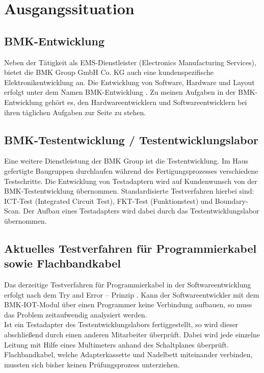 

\section{Ausgangssituation}


\subsection{BMK-Entwicklung}
Neben der Tätigkeit als EMS-Dienstleister (Electronics Manufacturing Services), bietet die \glqq BMK Group GmbH  Co. KG\grqq{} auch eine kundenspezifische Elektronikentwicklung an. Die Entwicklung von Software, Hardware und Layout erfolgt unter dem Namen \glqq BMK-Entwicklung\grqq{} . 
Zu meinen Aufgaben in der BMK-Entwicklung gehört es, den Hardwareentwicklern und Softwareentwicklern bei ihren täglichen Aufgaben zur Seite zu stehen. 


\subsection{BMK-Testentwicklung / Testentwicklungslabor}
Eine weitere Dienstleistung der \glqq BMK Group\grqq{} ist die \glqq Testentwicklung\grqq{}. Im Haus gefertigte Baugruppen durchlaufen während des Fertigungsprozesses verschiedene Testschritte. Die Entwicklung von Testadaptern wird auf Kundenwunsch von der BMK-Testentwicklung übernommen. Standardisierte Testverfahren hierbei sind: ICT-Test (Integrated Circuit Test), FKT-Test (Funktionstest) und Boundary-Scan. Der Aufbau eines Testadapters wird dabei durch das Testentwicklungslabor übernommen. 



\subsection{Aktuelles Testverfahren für Programmierkabel sowie Flachbandkabel}
Das derzeitige Testverfahren für Programmierkabel in der Softwareentwicklung erfolgt nach dem \glqq Try and Error – Prinzip\grqq{} . Kann der Softwareentwickler mit dem BMK-IOT-Modul über einen Programmer keine Verbindung  aufbauen, so muss das Problem zeitaufwendig analysiert werden.
\\
Ist ein Testadapter des Testentwicklungslabors fertiggestellt, so wird dieser abschließend durch einen anderen Mitarbeiter überprüft. Dabei wird jede einzelne Leitung mit Hilfe eines Multimeters anhand des Schaltplanes überprüft. Flachbandkabel, welche Adapterkassette und Nadelbett miteinander verbinden, mussten sich bisher keinen Prüfungsprozess unterziehen. 

